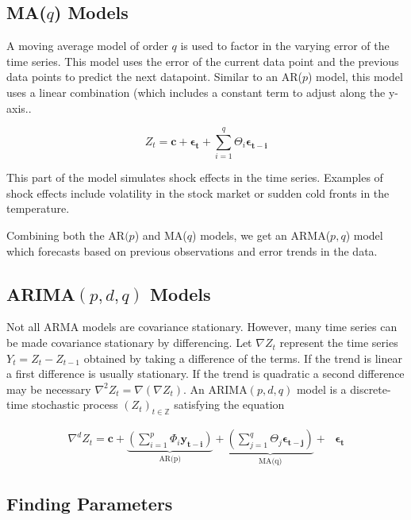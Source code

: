 \subsection*{MA($q$) Models} 

A moving average model of order $q$ is used to factor in the varying error of the time series.
This model uses the error of the current data point and the previous data points to predict the next datapoint.
Similar to an AR($p$) model, this model uses a linear combination (which includes a constant term to adjust along the y-axis..

\begin{equation}
Z_t = \mathbf{c} + \boldsymbol{\epsilon_t} + \sum_{i=1}^q\Theta_i\boldsymbol{\epsilon_{t-i}}
\label{eq:MA}
\end{equation}

This part of the model simulates shock effects in the time series.
Examples of shock effects include volatility in the stock market or sudden cold fronts in the temperature.

Combining both the AR$(p$) and MA($q$) models, we get an ARMA($p,q$) model which forecasts based on previous observations and error trends in the data.

\subsection*{ARIMA$(p,d,q)$ Models}

Not all ARMA models are covariance stationary. 
However, many time series can be made covariance stationary by differencing.
Let $\nabla Z_t$ represent the time series $Y_t = Z_t - Z_{t-1}$ obtained by taking a difference of the terms. 
If the trend is linear a first difference is usually stationary.
If the trend is quadratic a second difference may be necessary $\nabla ^2 Z_t = \nabla ( \nabla Z_t)$.
An $\text{ARIMA}(p,d,q)$ model is a discrete-time stochastic process $(Z_t)_{t \in \mathbb{Z}}$ satisfying the equation

\begin{align}
    \label{eq:arima:def}
    \nabla ^ d Z_t = \mathbf{c} + \underbrace{\left(\sum_{i=1}^p \Phi_{i}\mathbf{y_{t - i}}\right)}_\text{AR(p)} +  
    \underbrace{\left(\sum_{j=1}^{q} \Theta_{j}\boldsymbol{\epsilon_{t-j}} \right)}_\text{MA(q)} + \text{ } \boldsymbol{\epsilon_t}
\end{align}


\subsection*{Finding Parameters}

